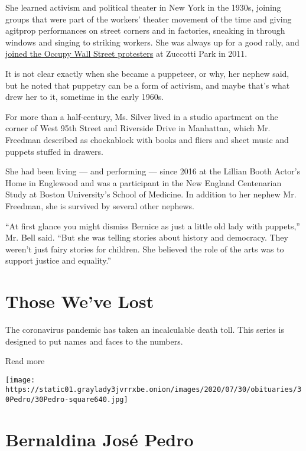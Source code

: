 She learned activism and political theater in New York in the 1930s,
joining groups that were part of the workers' theater movement of the
time and giving agitprop performances on street corners and in
factories, sneaking in through windows and singing to striking workers.
She was always up for a good rally, and
\href{https://www.youtube.com/watch?v=-gX8Hhraz8Q}{joined the Occupy
Wall Street protesters} at Zuccotti Park in 2011.

It is not clear exactly when she became a puppeteer, or why, her nephew
said, but he noted that puppetry can be a form of activism, and maybe
that's what drew her to it, sometime in the early 1960s.

For more than a half-century, Ms. Silver lived in a studio apartment on
the corner of West 95th Street and Riverside Drive in Manhattan, which
Mr. Freedman described as chockablock with books and fliers and sheet
music and puppets stuffed in drawers.

She had been living --- and performing --- since 2016 at the Lillian
Booth Actor's Home in Englewood and was a participant in the New England
Centenarian Study at Boston University's School of Medicine. In addition
to her nephew Mr. Freedman, she is survived by several other nephews.

``At first glance you might dismiss Bernice as just a little old lady
with puppets,'' Mr. Bell said. ``But she was telling stories about
history and democracy. They weren't just fairy stories for children. She
believed the role of the arts was to support justice and equality.''

\href{https://www.nytimes3xbfgragh.onion/interactive/2020/obituaries/people-died-coronavirus-obituaries.html?action=click\&pgtype=Article\&state=default\&region=BELOW_MAIN_CONTENT\&context=covid_obits_promo}{}

\hypertarget{those-weve-lost}{%
\section{Those We've Lost}\label{those-weve-lost}}

The coronavirus pandemic has taken an incalculable death toll. This
series is designed to put names and faces to the numbers.

Read more

\texttt{[image: https://static01.graylady3jvrrxbe.onion/images/2020/07/30/obituaries/30Pedro/30Pedro-square640.jpg]}

\hypertarget{bernaldina-josuxe9-pedro}{%
\section{Bernaldina José Pedro}\label{bernaldina-josuxe9-pedro}}

